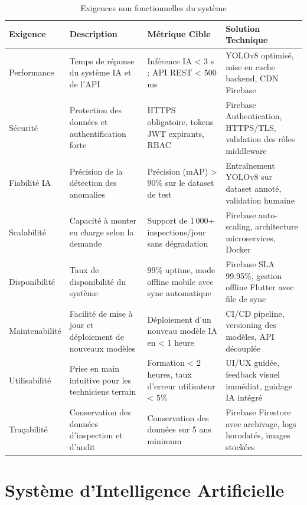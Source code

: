 \begin{table}[H]
\centering
\caption{Exigences non fonctionnelles du système}
\label{tab:non-fonctionnels}
\renewcommand{\arraystretch}{1.4}
\begin{tabularx}{\textwidth}{|l|X|l|X|}
\hline
\textbf{Exigence} & \textbf{Description} & \textbf{Métrique Cible} & \textbf{Solution Technique} \\
\hline
Performance
  & Temps de réponse du système IA et de l'API
  & Inférence IA < 3 s ; API REST < 500 ms
  & YOLOv8 optimisé, mise en cache backend, CDN Firebase \\
\hline
Sécurité
  & Protection des données et authentification forte
  & HTTPS obligatoire, tokens JWT expirants, RBAC
  & Firebase Authentication, HTTPS/TLS, validation des rôles middleware \\
\hline
Fiabilité IA
  & Précision de la détection des anomalies
  & Précision (mAP) > 90\% sur le dataset de test
  & Entraînement YOLOv8 sur dataset annoté, validation humaine \\
\hline
Scalabilité
  & Capacité à monter en charge selon la demande
  & Support de 1\,000+ inspections/jour sans dégradation
  & Firebase auto-scaling, architecture microservices, Docker \\
\hline
Disponibilité
  & Taux de disponibilité du système
  & 99\% uptime, mode offline mobile avec sync automatique
  & Firebase SLA 99.95\%, gestion offline Flutter avec file de sync \\
\hline
Maintenabilité
  & Facilité de mise à jour et déploiement de nouveaux modèles
  & Déploiement d'un nouveau modèle IA en < 1 heure
  & CI/CD pipeline, versioning des modèles, API découplée \\
\hline
Utilisabilité
  & Prise en main intuitive pour les techniciens terrain
  & Formation < 2 heures, taux d'erreur utilisateur < 5\%
  & UI/UX guidée, feedback visuel immédiat, guidage IA intégré \\
\hline
Traçabilité
  & Conservation des données d'inspection et d'audit
  & Conservation des données sur 5 ans minimum
  & Firebase Firestore avec archivage, logs horodatés, images stockées \\
\hline
\end{tabularx}
\end{table}

\section{Système d'Intelligence Artificielle}

